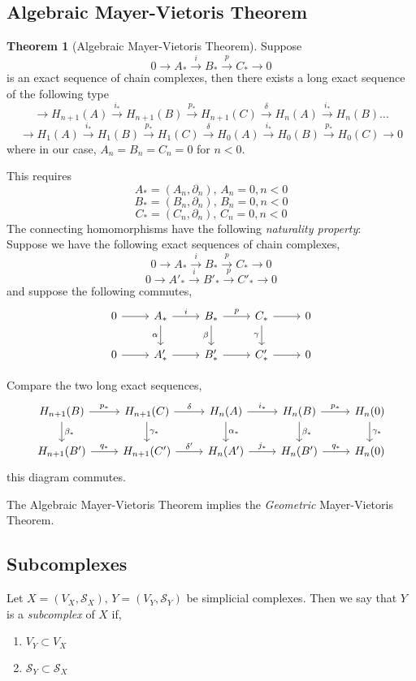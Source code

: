 \documentclass[a4paper,14pt]{extarticle}
\theoremstyle{definition}
\newtheorem*{theorem}{Theorem}
\begin{document}
\subsection{Algebraic Mayer-Vietoris Theorem}
\begin{theorem}[Algebraic Mayer-Vietoris Theorem]
	Suppose 
\[0\rightarrow A_*\xrightarrow{i} B_*\xrightarrow{p} C_*\rightarrow 0\]
is an exact sequence of chain complexes, then there exists a long exact
sequence of the following type
\[\rightarrow H_{n+1}(A)\xrightarrow{i_*} H_{n+1}(B)\xrightarrow{p_*} H_{n+1}(C)
\xrightarrow{\delta} H_n(A)\xrightarrow{i_*}H_n(B)\ldots\]
\[\rightarrow H_1(A)\xrightarrow{i_*}H_1(B)\xrightarrow{p_*}H_1(C)\xrightarrow{\delta}
H_0(A)\xrightarrow{i_*}H_0(B)\xrightarrow{p_*}H_0(C)\rightarrow 0\]
where in our case, $A_n=B_n=C_n=0$ for $n<0$.

This requires 
\[A_*=(A_n,\partial_n), \,A_n=0,n<0\]
\[B_*=(B_n,\partial_n), \,B_n=0,n<0\]
\[C_*=(C_n,\partial_n), \,C_n=0,n<0\]
The connecting homomorphisms have the following \emph{naturality property}: \\
Suppose we have the following exact sequences of chain complexes,
\[0\rightarrow A_*\xrightarrow{i} B_*\xrightarrow{p} C_*\rightarrow 0\]
\[0\rightarrow A'_*\xrightarrow{i} B'_*\xrightarrow{p} C'_*\rightarrow 0\]
and suppose the following commutes,
\[
\begin{tikzcd}
	0 \arrow{r} & A_* \arrow{r}{i} \arrow[swap]{d}{\alpha} & B_* \arrow{r}{p}
	\arrow{d}[swap]{\beta} & C_* \arrow{r} \arrow[swap]{d}{\gamma} & 0 \\
	0 \arrow{r} & A'_* \arrow{r} & B'_* \arrow{r} & C'_* \arrow{r} & 0
\end{tikzcd}
\]

Compare the two long exact sequences,
\[
\begin{tikzcd}
	H_{n+1}(B) \arrow{r}{p_*} \arrow{d}{\beta_*} & H_{n+1}(C) \arrow{r}{\delta}
	\arrow{d}{\gamma_*} & H_n(A) \arrow{r}{i_*}
	\arrow{d}{\alpha_*} & H_n(B) \arrow{r}{p_*} \arrow{d}{\beta_*} & 
	H_n(0) \arrow{d}{\gamma_*} \\
	H_{n+1}(B') \arrow{r}{q_*} & H_{n+1}(C') \arrow{r}{\delta'} &
	H_n(A') \arrow{r}{j_*} & H_n(B') \arrow{r}{q_*} & H_n(0)
\end{tikzcd}
\]
this diagram commutes. 
\end{theorem}

The Algebraic Mayer-Vietoris Theorem implies the \emph{Geometric}
Mayer-Vietoris Theorem.

\subsection{Subcomplexes}
Let $X=(V_X, \mathcal{S}_X), \,Y=(V_Y, \mathcal{S}_Y)$ be simplicial complexes.
Then we say that $Y$ is a \emph{subcomplex} of $X$ if,
\begin{enumerate}
	\item $V_Y\subset V_X$
	\item $\mathcal{S}_Y \subset \mathcal{S}_X$
\end{enumerate}
\end{document}

